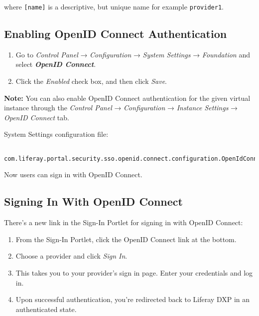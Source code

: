 where \texttt{{[}name{]}} is a descriptive, but unique name for example
\texttt{provider1}.

\noindent\hrulefill

\subsection{Enabling OpenID Connect
Authentication}\label{enabling-openid-connect-authentication}

\begin{enumerate}
\def\labelenumi{\arabic{enumi}.}
\item
  Go to \emph{Control Panel} → \emph{Configuration} → \emph{System
  Settings} → \emph{Foundation} and select \textbf{\emph{OpenID
  Connect}}.
\item
  Click the \emph{Enabled} check box, and then click \emph{Save}.
\end{enumerate}

\textbf{Note:} You can also enable OpenID Connect authentication for the
given virtual instance through the \emph{Control Panel} →
\emph{Configuration} → \emph{Instance Settings} → \emph{OpenID Connect}
tab.

\noindent\hrulefill

System Settings configuration file:

\begin{verbatim}
 com.liferay.portal.security.sso.openid.connect.configuration.OpenIdConnectConfiguration.config
\end{verbatim}

\noindent\hrulefill

Now users can sign in with OpenID Connect.

\subsection{Signing In With OpenID
Connect}\label{signing-in-with-openid-connect}

There's a new link in the Sign-In Portlet for signing in with OpenID
Connect:

\begin{enumerate}
\def\labelenumi{\arabic{enumi}.}
\item
  From the Sign-In Portlet, click the OpenID Connect link at the bottom.
\item
  Choose a provider and click \emph{Sign In}.
\item
  This takes you to your provider's sign in page. Enter your credentials
  and log in.
\item
  Upon successful authentication, you're redirected back to Liferay DXP
  in an authenticated state.
\end{enumerate}


